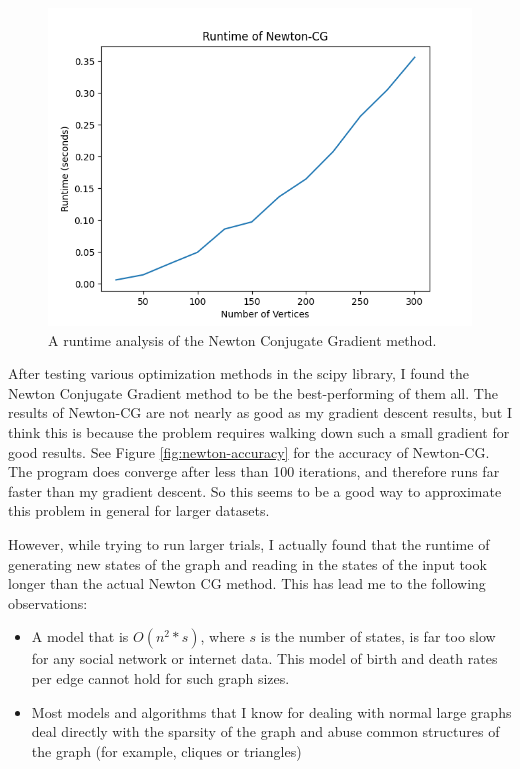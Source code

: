 \begin{figure}
    \begin{center}
        \includegraphics[scale=0.6]{figures/newton-runtime.png}
    \end{center}
    \caption{
        A runtime analysis of the Newton Conjugate Gradient method.
    }
    \label{fig:newton-runtime}
\end{figure}

After testing various optimization methods in the scipy library, I found the Newton Conjugate Gradient method to be the best-performing of them all.
The results of Newton-CG are not nearly as good as my gradient descent results, 
but I think this is because the problem requires walking down such a small gradient for good results.
See Figure \ref{fig:newton-accuracy} for the accuracy of Newton-CG.
The program does converge after less than 100 iterations, and therefore runs far faster than my gradient descent.
So this seems to be a good way to approximate this problem in general for larger datasets.

However, while trying to run larger trials, I actually found that the runtime of generating new states of the graph
and reading in the states of the input took longer than the actual Newton CG method.
This has lead me to the following observations:

\begin{itemize}
    \item A model that is $O(n^2*s)$, where $s$ is the number of states, is far too slow for any social network or internet data.
          This model of birth and death rates per edge cannot hold for such graph sizes.
    \item Most models and algorithms that I know for dealing with normal large graphs deal directly with the sparsity of the graph
          and abuse common structures of the graph (for example, cliques or triangles) 
\end{itemize}

